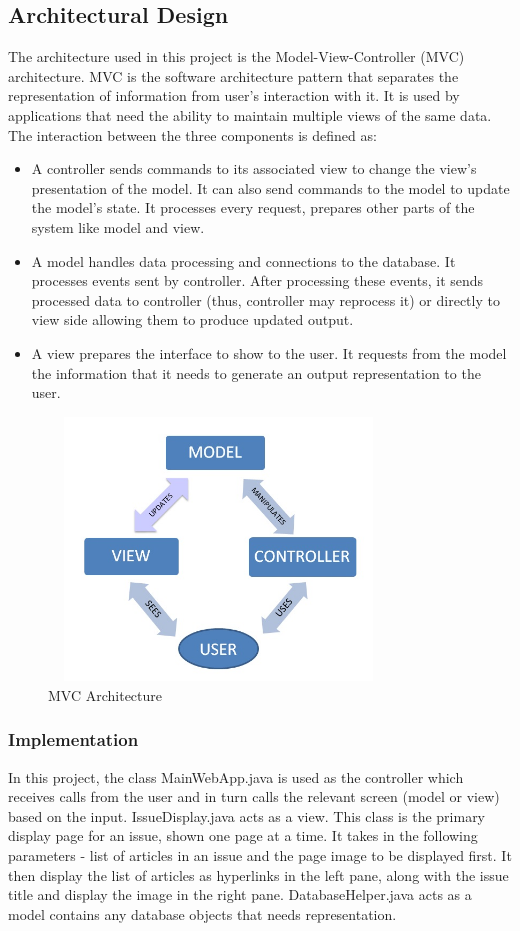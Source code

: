 \documentclass[12pt]{article}
\begin{document}
\subsection{Architectural Design}
The architecture used in this project is the Model-View-Controller (MVC) architecture. MVC is the software architecture pattern that separates the representation of information from user's interaction with it. It is used by applications that need the ability to maintain multiple views of the same data. The interaction between the three components is defined as: 
\begin{itemize}
\item A controller sends commands to its associated view to change the view's presentation of the model. It can also send commands to the model to update the model's state. It processes every request, prepares other parts of the system like model and view.

\item A model handles data processing and connections to the database. It processes events sent by controller. After processing these events, it sends processed data to controller (thus, controller may reprocess it) or directly to view side allowing them to produce updated output.

\item A view prepares the interface to show to the user. It requests from the model the information that it needs to generate an output representation to the user.
\end{itemize}
\begin{figure}[ht!]
\centering
\includegraphics[width=9cm,height=7cm]{mvc1.jpg}
\caption{MVC Architecture}
\label{fig:4}
\end{figure}

\subsubsection{Implementation}
In this project, the class MainWebApp.java is used as the controller which receives calls from the user and in turn calls the relevant screen (model or view) based on the input.
IssueDisplay.java acts as a view. This class is the primary display page for an issue, shown one page at a time.  It takes in the following parameters - list of articles in an issue and the page image to be displayed first.
It then display the list of articles as hyperlinks in the left pane, along with the issue title and display the image in the right pane. 
DatabaseHelper.java acts as a model contains any database objects that needs representation.
\end{document}
